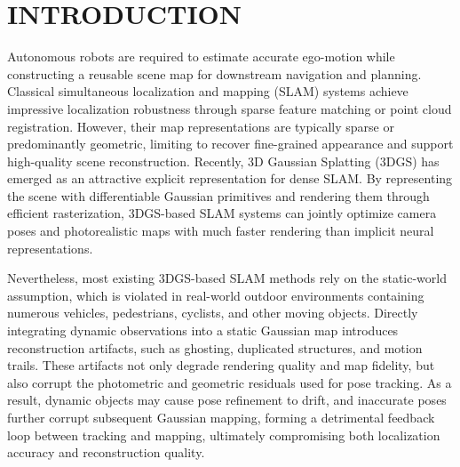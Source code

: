 \documentclass[letterpaper, 10 pt, conference]{ieeeconf}  %
\begin{document}


\section{INTRODUCTION}

Autonomous robots are required to estimate accurate ego-motion while constructing a reusable scene map for downstream navigation and planning. Classical simultaneous localization and mapping (SLAM) systems achieve impressive localization robustness through sparse feature matching or point cloud registration. However, their map representations are typically sparse or predominantly geometric, limiting to recover fine-grained appearance and support high-quality scene reconstruction.
Recently, 3D Gaussian Splatting (3DGS) has emerged as an attractive explicit representation for dense SLAM. By representing the scene with differentiable Gaussian primitives and rendering them through efficient rasterization, 3DGS-based SLAM systems can jointly optimize camera poses and photorealistic maps with much faster rendering than implicit neural representations. 


Nevertheless, most existing 3DGS-based SLAM methods rely on the static-world assumption, which is violated in real-world outdoor environments containing numerous vehicles, pedestrians, cyclists, and other moving objects. Directly integrating dynamic observations into a static Gaussian map introduces reconstruction artifacts, such as ghosting, duplicated structures, and motion trails. These artifacts not only degrade rendering quality and map fidelity, but also corrupt the photometric and geometric residuals used for pose tracking. 
As a result, dynamic objects may cause pose refinement to drift, and inaccurate poses further corrupt subsequent Gaussian mapping, forming a detrimental feedback loop between tracking and mapping, ultimately compromising both localization accuracy and reconstruction quality.
\end{document}
